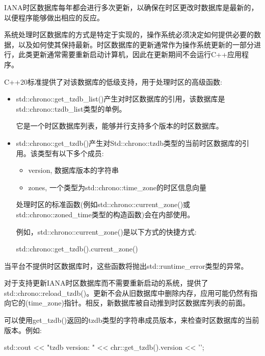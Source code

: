 
IANA时区数据库每年都会进行多次更新，以确保在时区更改时数据库是最新的，以便程序能够做出相应的反应。

系统处理时区数据库的方式是特定于实现的，操作系统必须决定如何提供必要的数据，以及如何使其保持最新。时区数据库的更新通常作为操作系统更新的一部分进行，此类更新通常需要重新启动计算机，因此在更新期间不会运行C++应用程序。

C++20标准提供了对该数据库的低级支持，用于处理时区的高级函数:

\begin{itemize}
\item
std::chrono::get\_tzdb\_list()产生对时区数据库的引用，该数据库是std::chrono::tzdb\_list类型的单例。

它是一个时区数据库列表，能够并行支持多个版本的时区数据库。

\item
std::chrono::get\_tzdb()产生对Std::chrono::tzdb类型的当前时区数据库的引用。该类型有以下多个成员:

\begin{itemize}
\item
version, 数据库版本的字符串

\item
zones, 一个类型为std::chrono::time\_zone的时区信息向量
\end{itemize}

处理时区的标准函数(例如std::chrono::current\_zone()或std::chrono::zoned\_time类型的构造函数)会在内部使用。

例如，std::chrono::current\_zone()是以下方式的快捷方式:

\begin{cpp}
std::chrono::get_tzdb().current_zone()
\end{cpp}
\end{itemize}

当平台不提供时区数据库时，这些函数将抛出std::runtime\_error类型的异常。

对于支持更新IANA时区数据库而不需要重新启动的系统，提供了std::chrono::reload\_tzdb()。更新不会从旧数据库中删除内存，应用可能仍然有指向它的(time\_zone)指针。相反，新数据库被自动推到时区数据库列表的前面。

可以使用get\_tzdb()返回的tzdb类型的字符串成员版本，来检查时区数据库的当前版本。例如:

\begin{cpp}
std::cout << "tzdb version: " << chr::get_tzdb().version << '\n';
\end{cpp}


